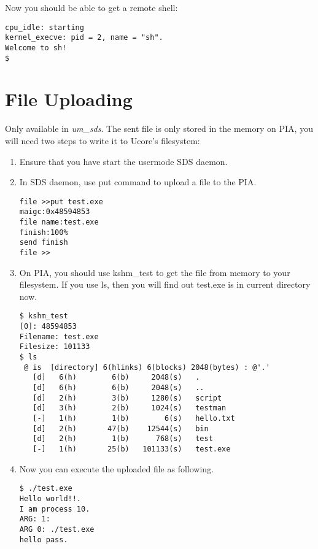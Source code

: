 \documentclass[a4paper]{article}
\begin{document}
Now you should be able to get a remote shell:
\begin{verbatim}
cpu_idle: starting
kernel_execve: pid = 2, name = "sh".
Welcome to sh!
$                                   
\end{verbatim}






\section{File Uploading}
Only available in \emph{um\_sds}. The sent file is only stored
in the memory on PIA, you will need two steps to write it to
Ucore's filesystem:
\begin{enumerate}
\item Ensure that you have start the usermode SDS daemon.
\item In SDS daemon, use put command to upload a file to the PIA.
\begin{verbatim}
file >>put test.exe
maigc:0x48594853
file name:test.exe
finish:100%
send finish
file >>
\end{verbatim}


\item On PIA, you should use kshm\_test to get the file from memory to your filesystem. If you use ls, then you will find out test.exe is in current directory now.
\begin{verbatim}
$ kshm_test
[0]: 48594853
Filename: test.exe
Filesize: 101133
$ ls 
 @ is  [directory] 6(hlinks) 6(blocks) 2048(bytes) : @'.'
   [d]   6(h)        6(b)     2048(s)   .
   [d]   6(h)        6(b)     2048(s)   ..
   [d]   2(h)        3(b)     1280(s)   script
   [d]   3(h)        2(b)     1024(s)   testman
   [-]   1(h)        1(b)        6(s)   hello.txt
   [d]   2(h)       47(b)    12544(s)   bin
   [d]   2(h)        1(b)      768(s)   test
   [-]   1(h)       25(b)   101133(s)   test.exe

\end{verbatim}

\item Now you can execute the uploaded file as following.
\begin{verbatim}
$ ./test.exe
Hello world!!.
I am process 10.
ARG: 1:
ARG 0: ./test.exe
hello pass.
\end{verbatim}
\end{enumerate}
\end{document}
